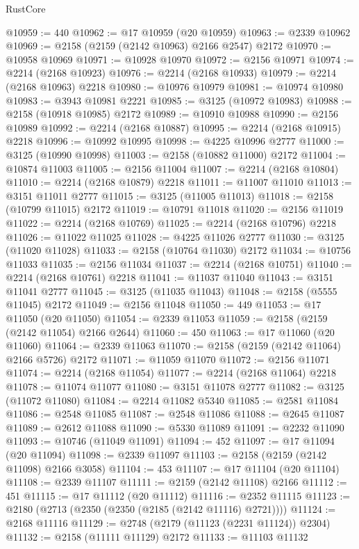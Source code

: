 \begin{lexlean}{RustCore}
\begin{coremodule}
@10959 := 440
@10962 := @17 @10959 (@20 @10959)
@10963 := @2339 @10962
@10969 := @2158 (@2159 (@2142 @10963) @2166 @2547) @2172
@10970 := @10958 @10969
@10971 := @10928 @10970
@10972 := @2156 @10971
@10974 := @2214 (@2168 @10923)
@10976 := @2214 (@2168 @10933)
@10979 := @2214 (@2168 @10963) @2218
@10980 := @10976 @10979
@10981 := @10974 @10980
@10983 := @3943 @10981 @2221
@10985 := @3125 (@10972 @10983)
@10988 := @2158 (@10918 @10985) @2172
@10989 := @10910 @10988
@10990 := @2156 @10989
@10992 := @2214 (@2168 @10887)
@10995 := @2214 (@2168 @10915) @2218
@10996 := @10992 @10995
@10998 := @4225 @10996 @2777
@11000 := @3125 (@10990 @10998)
@11003 := @2158 (@10882 @11000) @2172
@11004 := @10874 @11003
@11005 := @2156 @11004
@11007 := @2214 (@2168 @10804)
@11010 := @2214 (@2168 @10879) @2218
@11011 := @11007 @11010
@11013 := @3151 @11011 @2777
@11015 := @3125 (@11005 @11013)
@11018 := @2158 (@10799 @11015) @2172
@11019 := @10791 @11018
@11020 := @2156 @11019
@11022 := @2214 (@2168 @10769)
@11025 := @2214 (@2168 @10796) @2218
@11026 := @11022 @11025
@11028 := @4225 @11026 @2777
@11030 := @3125 (@11020 @11028)
@11033 := @2158 (@10764 @11030) @2172
@11034 := @10756 @11033
@11035 := @2156 @11034
@11037 := @2214 (@2168 @10751)
@11040 := @2214 (@2168 @10761) @2218
@11041 := @11037 @11040
@11043 := @3151 @11041 @2777
@11045 := @3125 (@11035 @11043)
@11048 := @2158 (@5555 @11045) @2172
@11049 := @2156 @11048
@11050 := 449
@11053 := @17 @11050 (@20 @11050)
@11054 := @2339 @11053
@11059 := @2158 (@2159 (@2142 @11054) @2166 @2644)
@11060 := 450
@11063 := @17 @11060 (@20 @11060)
@11064 := @2339 @11063
@11070 := @2158 (@2159 (@2142 @11064) @2166 @5726) @2172
@11071 := @11059 @11070
@11072 := @2156 @11071
@11074 := @2214 (@2168 @11054)
@11077 := @2214 (@2168 @11064) @2218
@11078 := @11074 @11077
@11080 := @3151 @11078 @2777
@11082 := @3125 (@11072 @11080)
@11084 := @2214 @11082 @5340
@11085 := @2581 @11084
@11086 := @2548 @11085
@11087 := @2548 @11086
@11088 := @2645 @11087
@11089 := @2612 @11088
@11090 := @5330 @11089
@11091 := @2232 @11090
@11093 := @10746 (@11049 @11091)
@11094 := 452
@11097 := @17 @11094 (@20 @11094)
@11098 := @2339 @11097
@11103 := @2158 (@2159 (@2142 @11098) @2166 @3058)
@11104 := 453
@11107 := @17 @11104 (@20 @11104)
@11108 := @2339 @11107
@11111 := @2159 (@2142 @11108) @2166
@11112 := 451
@11115 := @17 @11112 (@20 @11112)
@11116 := @2352 @11115
@11123 := @2180 (@2713 (@2350 (@2350 (@2185 (@2142 @11116) @2721))))
@11124 := @2168 @11116
@11129 := @2748 (@2179 (@11123 (@2231 @11124)) @2304)
@11132 := @2158 (@11111 @11129) @2172
@11133 := @11103 @11132

\end{coremodule}
\end{lexlean}
